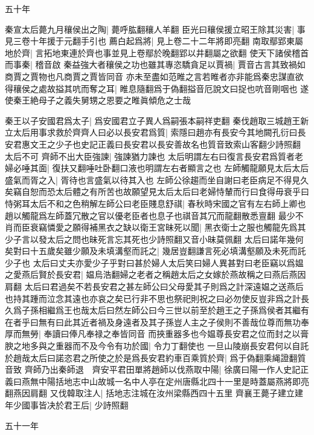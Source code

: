 五十年

秦宣太后薨九月穰侯出之陶|{
	薨呼肱翻穰人羊翻}
臣光曰穰侯援立昭王除其災害|{
	事見三卷十年援于元翻手引也}
薦白起爲將|{
	見上卷二十二年將即亮翻}
南取鄢郢東屬地於齊|{
	言拓地東連於齊也事並見上卷鄢於晚翻郢以井翻屬之欲翻}
使天下諸侯稽首而事秦|{
	稽音啟}
秦益強大者穰侯之功也雖其專恣驕貪足以賈禍|{
	賈音古言其致禍如商賈之賈物也凡商賈之賈皆同音}
亦未至盡如范睢之言若睢者亦非能爲秦忠謀直欲得穰侯之處故搤其吭而奪之耳|{
	睢息隨翻爲于偽翻搤音厄說文曰捉也吭音剛咽也}
遂使秦王絶母子之義失舅甥之恩要之睢眞傾危之士哉

秦王以子安國君爲太子|{
	爲安國君立子異人爲嗣張本嗣祥吏翻}
秦伐趙取三城趙王新立太后用事求救於齊齊人曰必以長安君爲質|{
	索隱曰趙亦有長安今其地闕孔衍曰長安君惠文王之少子也史記正義曰長安君以長安善故名也質音致索山客翻少詩照翻}
太后不可
齊師不出大臣強諫|{
	強諫猶力諫也}
太后明謂左右曰復言長安君爲質者老婦必唾其面|{
	復扶又翻唾吐卧翻口液也明謂左右者顯言之也}
左師觸龍願見太后太后盛氣而胥之入|{
	胥待也言盛氣以待其入也}
左師公徐趨而坐自謝曰老臣病足不得見久矣竊自恕而恐太后體之有所苦也故願望見太后太后曰老婦恃輦而行曰食得毋衰乎曰恃粥耳太后不和之色稍解左師公曰老臣賤息舒祺|{
	春秋時宋國之官有左右師上卿也趙以觸龍爲左師蓋冗散之官以優老臣者也息子也祺音其冗而龍翻散悉亶翻}
最少不肖而臣衰竊憐愛之願得補黑衣之缺以衛王宮昧死以聞|{
	黑衣衛士之服也觸龍先爲其少子言以發太后之問也昧死言忘其死也少詩照翻又音小昧莫佩翻}
太后曰諾年幾何矣對曰十五歲矣雖少願及未填溝壑而託之|{
	幾居豈翻謙言死必填溝壑願及未死而託少子也}
太后曰丈夫亦愛少子乎對曰甚於婦人太后笑曰婦人異甚對曰老臣竊以爲媪之愛燕后賢於長安君|{
	媪烏浩翻婦之老者之稱趙太后之女嫁於燕故稱之曰燕后燕因肩翻}
太后曰君過矣不若長安君之甚左師公曰父母愛其子則爲之計深遠媪之送燕后也持其踵而泣念其遠也亦哀之矣已行非不思也祭祀則祝之曰必勿使反豈非爲之計長久爲子孫相繼爲王也哉太后曰然左師公曰今三世以前至於趙王之子孫爲侯者其繼有在者乎曰無有曰此其近者禍及身遠者及其子孫豈人主之子侯則不善哉位尊而無功奉厚而無勞|{
	奉讀曰俸凡奉禄之奉皆同音}
而挾重器多也今媪尊長安君之位而封之以膏腴之地多與之重器而不及今令有功於國|{
	令力丁翻使也}
一旦山陵崩長安君何以自託於趙哉太后曰諾恣君之所使之於是爲長安君約車百乘質於齊|{
	爲于偽翻乘䋲證翻質音致}
齊師乃出秦師退　齊安平君田單將趙師以伐燕取中陽|{
	徐廣曰陽一作人史記正義曰燕無中陽括地志中山故城一名中人亭在定州唐縣北四十一里是時蓋屬燕將即亮翻燕因肩翻}
又伐韓取注人|{
	括地志注城在汝州梁縣西四十五里}
齊襄王薨子建立建年少國事皆决於君王后|{
	少詩照翻}


五十一年


